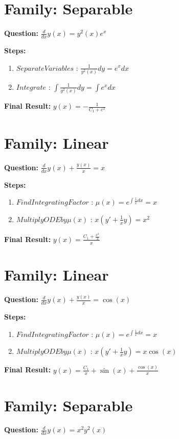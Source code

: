 \documentclass{article}
\begin{document}
\section*{Family: Separable}
\textbf{Question:} $\frac{d}{d x} y{\left(x \right)} = y^{2}{\left(x \right)} e^{x}$

\textbf{Steps:}
\begin{enumerate}
\item $Separate Variables$ :  $\frac{1}{y^{2}{\left(x \right)}} dy = e^{x} dx$
\item $Integrate$ :  $\int \frac{1}{y^{2}{\left(x \right)}} dy = \int e^{x} dx$
\end{enumerate}
\textbf{Final Result:} $y{\left(x \right)} = - \frac{1}{C_{1} + e^{x}}$

\section*{Family: Linear}
\textbf{Question:} $\frac{d}{d x} y{\left(x \right)} + \frac{y{\left(x \right)}}{x} = x$

\textbf{Steps:}
\begin{enumerate}
\item $Find Integrating Factor$ :  $\mu(x) = e^{\int \frac{1}{x} dx} = x$
\item $Multiply ODE by \mu(x)$ :  $x(y' + \frac{1}{x}y) = x^{2}$
\end{enumerate}
\textbf{Final Result:} $y{\left(x \right)} = \frac{C_{1} + \frac{x^{3}}{3}}{x}$

\section*{Family: Linear}
\textbf{Question:} $\frac{d}{d x} y{\left(x \right)} + \frac{y{\left(x \right)}}{x} = \cos{\left(x \right)}$

\textbf{Steps:}
\begin{enumerate}
\item $Find Integrating Factor$ :  $\mu(x) = e^{\int \frac{1}{x} dx} = x$
\item $Multiply ODE by \mu(x)$ :  $x(y' + \frac{1}{x}y) = x \cos{\left(x \right)}$
\end{enumerate}
\textbf{Final Result:} $y{\left(x \right)} = \frac{C_{1}}{x} + \sin{\left(x \right)} + \frac{\cos{\left(x \right)}}{x}$

\section*{Family: Separable}
\textbf{Question:} $\frac{d}{d x} y{\left(x \right)} = x^{2} y^{2}{\left(x \right)}$
\end{document}
